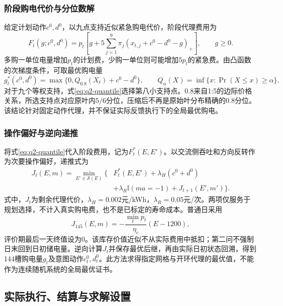 \subsubsection{阶段购电代价与分位数解}

给定计划动作$c^0,d^0$，以九点支持近似紧急购电代价，阶段代理费用为
\begin{equation}\label{eq:q2-stage}
 F_t(g;c^0,d^0)=p_t\left[g+5\sum_{j=1}^{9}\pi_j
 (x_{t,j}+c^0-d^0-g)_+\right],\qquad g\ge0.
\end{equation}
多购一单位电量增加$p_t$的计划费，少购一单位则可能增加$5p_t$的紧急费。由凸函数的次梯度条件，可取最优购电量
\begin{equation}\label{eq:q2-quantile}
 g_t^*(c^0,d^0)=\max\{0,Q_{0.8}(X_t)+c^0-d^0\},
 \qquad Q_\alpha(X)=\inf\{x:\Pr(X\le x)\ge\alpha\}.
\end{equation}
对于九个等权支持，式\eqref{eq:q2-quantile}选择第八小支持点。0.8来自1:5的边际价格关系，所选支持点对应原叶内$5/6$分位，压缩后不再是原始叶分布精确的0.8分位。该结论针对固定动作代理，并不保证实际反馈执行下的全局最优购电。

\subsubsection{操作偏好与逆向递推}

将式\eqref{eq:q2-quantile}代入阶段费用，记为$F_t^*(E,E')$。以交流侧吞吐和方向反转作为次要操作偏好，递推式为
\begin{equation}\label{eq:q2-bellman}
 \begin{aligned}
 J_t(E,m)=\min_{E'\in\mathcal S(E)}\bigl\{&F_t^*(E,E')
 +\lambda_H(c^0+d^0)\\
 &+\lambda_R\mathbb I(ma=-1)+J_{t+1}(E',m')\bigr\}.
 \end{aligned}
\end{equation}
式中，$J_t$为剩余代理代价，$\lambda_H=0.002$元/kWh，$\lambda_R=0.05$元/次。两项仅服务于规划选择，不计入真实购电费，也不是已标定的寿命成本。普通日采用
\begin{equation}\label{eq:q2-terminal}
 J_{145}(E,m)=-\frac{\min_t p_t}{\eta_c}(E-1200),
\end{equation}
评价期最后一天终值设为0。该库存价值近似不从实际费用中抵扣；第二问不强制日末回到日初储电量。逆向计算$J_t$并保存最优后继，再由实际日初状态回溯，得到144槽购电量$g_t$及意图动作$c_t^0,d_t^0$。此方法求得指定网格与开环代理的最优值，不能作为连续随机系统的全局最优证书。

\subsection{实际执行、结算与求解设置}
